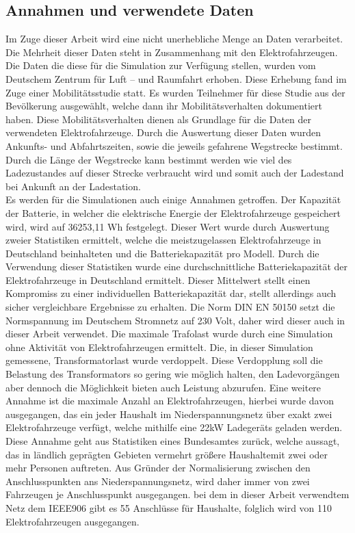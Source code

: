 \subsection{Annahmen und verwendete Daten}
Im Zuge dieser Arbeit wird eine nicht unerhebliche Menge an Daten verarbeitet. Die Mehrheit dieser Daten steht in Zusammenhang mit den Elektrofahrzeugen. Die Daten die diese für die Simulation zur Verfügung stellen, wurden vom Deutschem Zentrum für Luft – und Raumfahrt erhoben. Diese Erhebung fand im Zuge einer Mobilitätsstudie statt. Es wurden Teilnehmer für diese Studie aus der Bevölkerung ausgewählt, welche dann ihr Mobilitätsverhalten dokumentiert haben. Diese Mobilitätsverhalten dienen als Grundlage für die Daten der verwendeten Elektrofahrzeuge. Durch die Auswertung dieser Daten wurden Ankunfts- und Abfahrtszeiten, sowie die jeweils gefahrene Wegstrecke bestimmt. Durch die Länge der Wegstrecke kann bestimmt werden wie viel des Ladezustandes auf dieser Strecke verbraucht wird und somit auch der Ladestand bei Ankunft an der Ladestation.\\
Es werden für die Simulationen auch einige Annahmen getroffen. Der Kapazität der Batterie, in welcher die elektrische Energie der Elektrofahrzeuge gespeichert wird, wird auf 36253,11 Wh festgelegt. Dieser Wert wurde durch Auswertung zweier Statistiken ermittelt, welche die meistzugelassen Elektrofahrzeuge in Deutschland beinhalteten und die Batteriekapazität pro Modell. Durch die Verwendung dieser Statistiken wurde eine durchschnittliche Batteriekapazität der Elektrofahrzeuge in Deutschland ermittelt. Dieser Mittelwert stellt einen Kompromiss zu einer individuellen Batteriekapazität dar, stellt allerdings auch sicher vergleichbare Ergebnisse zu erhalten. Die Norm DIN EN 50150 setzt die Normspannung im Deutschem Stromnetz auf 230 Volt, daher wird dieser auch in dieser Arbeit verwendet. Die maximale Trafolast wurde durch eine Simulation ohne Aktivität von Elektrofahrzeugen ermittelt. Die, in dieser Simulation gemessene, Transformatorlast wurde verdoppelt. Diese Verdopplung soll die Belastung des Transformators so gering wie möglich halten, den Ladevorgängen aber dennoch die Möglichkeit bieten auch Leistung abzurufen. Eine weitere Annahme ist die maximale Anzahl an Elektrofahrzeugen, hierbei wurde davon ausgegangen, das ein jeder Haushalt im Niederspannungsnetz über exakt zwei Elektrofahrzeuge verfügt, welche mithilfe eine 22kW Ladegeräts geladen werden. Diese Annahme geht aus Statistiken eines Bundesamtes zurück, welche aussagt, das in ländlich geprägten Gebieten vermehrt größere Haushaltemit zwei oder mehr Personen auftreten. Aus Gründer der Normalisierung zwischen den Anschlusspunkten ans Niederspannungsnetz, wird daher immer von zwei Fahrzeugen je Anschlusspunkt ausgegangen. bei dem in dieser Arbeit verwendtem Netz dem IEEE906 gibt es 55 Anschlüsse für Haushalte, folglich wird von 110 Elektrofahrzeugen ausgegangen.

